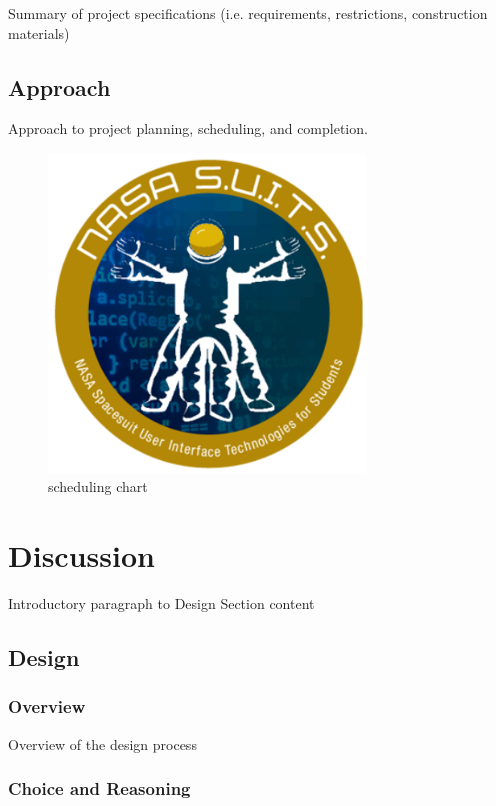\documentclass{article}
\let\Oldsection\section
\renewcommand{\section}{\FloatBarrier\Oldsection}
\let\Oldsubsection\subsection
\renewcommand{\subsection}{\FloatBarrier\Oldsubsection}
\let\Oldsubsubsection\subsubsection
\renewcommand{\subsubsection}{\FloatBarrier\Oldsubsubsection}
\begin{document}
Summary of project specifications (i.e. requirements, restrictions, construction materials)

\subsection{Approach}

Approach to project planning, scheduling, and completion.

\begin{figure}[!htb]
  \centering
  \includegraphics[width=0.75\textwidth]{assets/logo.png}
  \caption{scheduling chart}
  \label{fig:spacesuitdisplay}
\end{figure}

\section{Discussion}

Introductory paragraph to Design Section content

\subsection{Design}

\subsubsection{Overview}

Overview of the design process

\subsubsection{Choice and Reasoning}
\end{document}
